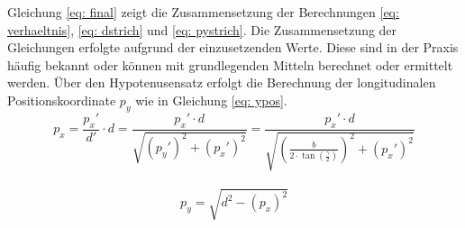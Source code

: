 		Gleichung \ref{eq: final} zeigt die Zusammensetzung der Berechnungen \ref{eq: verhaeltnis}, \ref{eq: dstrich} und \ref{eq: pystrich}. Die Zusammensetzung der Gleichungen erfolgte aufgrund der einzusetzenden Werte. Diese sind in der Praxis häufig bekannt oder können mit grundlegenden Mitteln berechnet oder ermittelt werden. Über den Hypotenusensatz erfolgt die Berechnung der longitudinalen Positionskoordinate $p_y$ wie in Gleichung \ref{eq: ypos}.\\		
	
		
		\begin{equation}
			p_x=\frac{{p_x}'}{d'}\cdot d=\frac{{p_x}'\cdot d}{\sqrt{({p_y}')^2+({p_x}')^2}}=\frac{{p_x}'\cdot d}{\sqrt{\left(\frac{b}{2\cdot \tan(\frac{\gamma}{2})}\right)^2+({p_x}')^2}}
			\label{eq: final}
		\end{equation}\\
	
		\begin{equation}
			p_y=\sqrt{d^2-(p_x)^2}
			\label{eq: ypos}
		\end{equation}
		
	
		
	
		
			
	
		


	     
	

